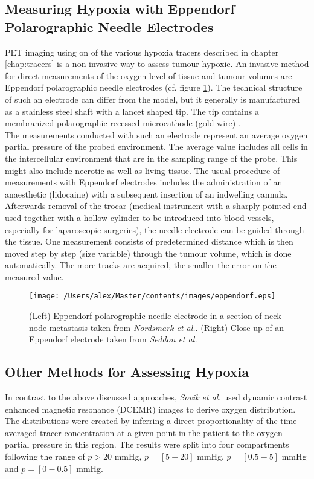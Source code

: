 \subsection[Eppendorf Polarographic Needle Electrodes]{Measuring Hypoxia with Eppendorf Polarographic Needle Electrodes}\label{chap:eppendorf}
PET imaging using on of the various hypoxia tracers described in chapter \ref{chap:tracers} is a non-invasive way to assess tumour hypoxic. An invasive method for direct measurements of the oxygen level of tissue and tumour volumes are Eppendorf polarographic needle electrodes (cf. figure \ref{fig:eppendorf}). The technical structure of such an electrode can differ from the model, but it generally is manufactured as a stainless steel shaft with a lancet shaped tip. The tip contains a membranized polarographic recessed microcathode (gold wire) \cite{pmid8018370}.\\The measurements conducted with such an electrode represent an average oxygen partial pressure of the probed environment. The average value includes all cells in the intercellular environment that are in the sampling range of the probe. This might also include necrotic as well as living tissue. The usual procedure of measurements with Eppendorf electrodes includes the administration of an anaesthetic (lidocaine) with a subsequent insertion of an indwelling cannula. Afterwards removal of the trocar (medical instrument with a sharply pointed end used together with a hollow cylinder to be introduced into blood vessels, especially for laparoscopic surgeries), the needle electrode can be guided through the tissue. One measurement consists of predetermined distance which is then moved step by step (size variable) through the tumour volume, which is done automatically. The more tracks are acquired, the smaller the error on the measured value. 
\begin{figure}[hbt]
\centering
\texttt{[image: /Users/alex/Master/contents/images/eppendorf.eps]}
\vspace{1cm}
\caption{(Left) Eppendorf polarographic needle electrode in a section of neck node metastasis taken from \textit{Nordsmark et al.}\cite{pmid8018370}. (Right) Close up of an Eppendorf electrode taken from \textit{Seddon et al.}\cite{pmid11352767}}
\label{fig:eppendorf}
\end{figure}
\subsection{Other Methods for Assessing Hypoxia}\label{chap:otherhypoxiamethods}
In contrast to the above discussed approaches, \textit{Sovik et al.} \cite{pmid17674980} used dynamic contrast enhanced magnetic resonance (DCEMR) images to derive oxygen distribution. The distributions were created by inferring a direct proportionality of the time-averaged tracer concentration at a given point in the patient to the oxygen partial pressure in this region. The results were split into four compartments following the range of $p>20$ mmHg, $p=[5-20]$ mmHg, $p=[0.5-5]$ mmHg and $p = [0-0.5]$ mmHg.
